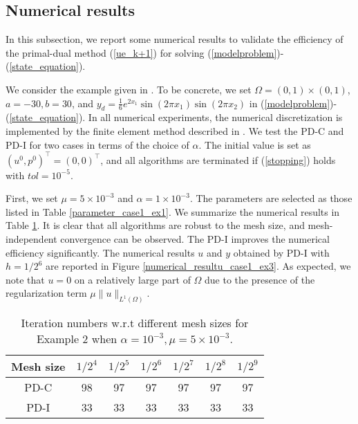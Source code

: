 \documentclass[final]{siamart171218}
\theoremstyle{remark}
\begin{document}
\subsection{Numerical results}

In this subsection, we report some numerical results to validate the efficiency of the primal-dual method (\ref{ue_k+1}) for solving (\ref{modelproblem})-(\ref{state_equation}).

\medskip
{} We consider the example given in \cite{stadler2009elliptic}. To be concrete, we set $\Omega=(0,1)\times(0,1)$,  $a=-30, b = 30$, and $y_d =
\frac{1}{6}e^{2x_1}\sin(2\pi x_1)\sin(2\pi x_2)$ in (\ref{modelproblem})-(\ref{state_equation}). In all numerical experiments, the numerical discretization is implemented by the finite element method described in \cite{wachsmuth2011}. We test the PD-C and PD-I for two cases in terms of the choice of $\alpha$. The initial value is set as $(u^0,p^0)^\top=(0,0)^\top$, and all algorithms are terminated if (\ref{stopping}) holds with $tol=10^{-5}$.

First, we set $\mu=5\times10^{-3}$ and $\alpha= 1\times10^{-3}$. The parameters are selected as those listed in Table \ref{parameter_case1_ex1}. We summarize the numerical results in Table \ref{tab:meshindependent_case1_ex3}. It is clear that all algorithms are robust to the mesh size, and mesh-independent convergence can be observed. The PD-I improves the numerical efficiency significantly. The numerical results $u$ and $y$ obtained by PD-I with $h={1}/{2^6}$ are reported in Figure \ref{numerical_resultu_case1_ex3}. As expected, we note that  $u = 0$ on a relatively
large part of $\Omega$ due to the presence of the regularization term $\mu\|u\|_{L^1(\Omega)}$.
\begin{table}[h!]
	\centering
	\caption{Iteration numbers w.r.t different mesh sizes for Example 2 when $\alpha=10^{-3}, \mu=5\times10^{-3}$.}\label{tab:meshindependent_case1_ex3}
	{\footnotesize\begin{tabular}{|c|c|c|c|c|c|c|}
			\hline
			Mesh size&$1/{2^4}$&$1/{2^5}$&$1/{2^6}$&$1/{2^7}$&$1/{2^8}$&$1/{2^9}$\\
			\hline
			PD-C&98 &97& 97& 97& 97& 97\\
			\hline
			PD-I&33& 33&33 &33 & 33& 33\\
			\hline
		\end{tabular}
	}
\end{table}
\end{document}
